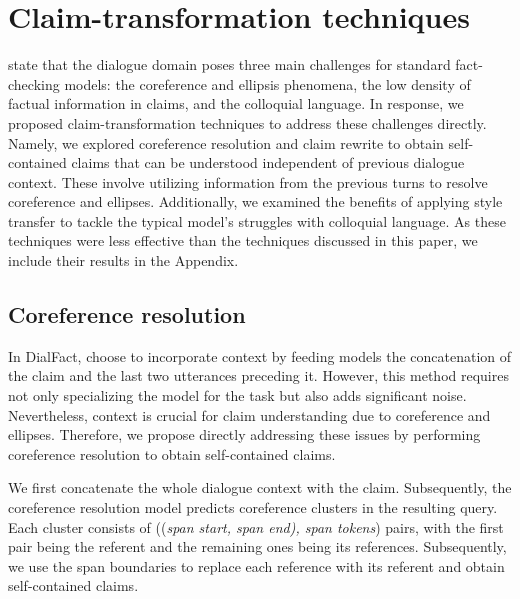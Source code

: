 

\section{Claim-transformation techniques}
\citet{dialfact} state that the dialogue domain poses three main challenges for standard fact-checking models: the coreference and ellipsis phenomena, the low density of factual information in claims, and the colloquial language. In response, we proposed claim-transformation techniques to address these challenges directly.
Namely, we explored coreference resolution \cite{spanbert} and claim rewrite \cite{cread} to obtain self-contained claims that can be understood independent of previous dialogue context. These involve utilizing information from the previous turns to resolve coreference and ellipses. Additionally, we examined the benefits of applying style transfer to tackle the typical model's struggles with colloquial language. As these techniques were less effective than the techniques discussed in this paper, we include their results in the Appendix.
\subsection{Coreference resolution}
In DialFact, \citet{dialfact} choose to incorporate context by feeding models the concatenation of the claim and the last two utterances preceding it. However, this method requires not only specializing the model for the task but also adds significant noise. Nevertheless, context is crucial for claim understanding due to coreference and ellipses. Therefore, we propose directly addressing these issues by performing coreference resolution to obtain self-contained claims. 

We first concatenate the whole dialogue context with the claim. Subsequently, the coreference resolution model predicts coreference clusters in the resulting query. Each cluster consists of ((\textit{span start, span end), span tokens}) pairs, with the first pair being the referent and the remaining ones being its references. Subsequently, we use the span boundaries to replace each reference with its referent and obtain self-contained claims.

